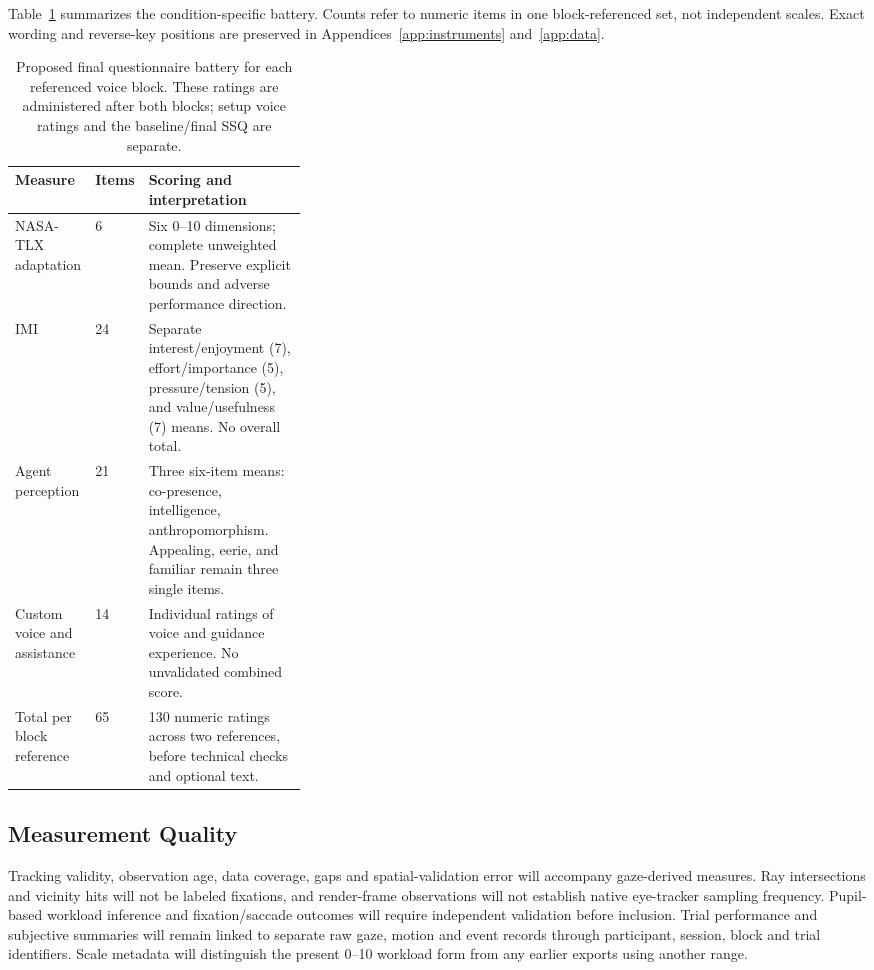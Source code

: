 Table~\ref{tab:battery} summarizes the condition-specific battery. Counts refer to numeric items in one block-referenced set, not independent scales. Exact wording and reverse-key positions are preserved in Appendices~\ref{app:instruments} and~\ref{app:data}.
\begin{table}[htbp]
\centering
\caption[Condition-specific questionnaire battery]{Proposed final questionnaire battery for each referenced voice block. These ratings are administered after both blocks; setup voice ratings and the baseline/final SSQ are separate.}
\label{tab:battery}
\small
{}
\begin{tabularx}{\linewidth}{@{}p{0.25\linewidth}p{0.09\linewidth}X@{}}
\toprule
Measure & Items & Scoring and interpretation \\\midrule
NASA-TLX adaptation & 6 & Six 0--10 dimensions; complete unweighted mean. Preserve explicit bounds and adverse performance direction. \\
IMI & 24 & Separate interest/enjoyment (7), effort/importance (5), pressure/tension (5), and value/usefulness (7) means. No overall total. \\
Agent perception & 21 & Three six-item means: co-presence, intelligence, anthropomorphism. Appealing, eerie, and familiar remain three single items. \\
Custom voice and assistance & 14 & Individual ratings of voice and guidance experience. No unvalidated combined score. \\\midrule
Total per block reference & 65 & 130 numeric ratings across two references, before technical checks and optional text. \\\bottomrule
\end{tabularx}
\end{table}

\subsection{Measurement Quality}
Tracking validity, observation age, data coverage, gaps and spatial-validation error will accompany gaze-derived measures. Ray intersections and vicinity hits will not be labeled fixations, and render-frame observations will not establish native eye-tracker sampling frequency. Pupil-based workload inference and fixation/saccade outcomes will require independent validation before inclusion. Trial performance and subjective summaries will remain linked to separate raw gaze, motion and event records through participant, session, block and trial identifiers. Scale metadata will distinguish the present 0--10 workload form from any earlier exports using another range.

